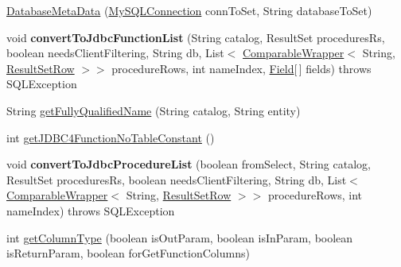 \begin{DoxyCompactItemize}
\item 
\mbox{\hyperlink{classcom_1_1mysql_1_1jdbc_1_1_database_meta_data_a754255faffa1310c4d9507733583ae72}{Database\+Meta\+Data}} (\mbox{\hyperlink{interfacecom_1_1mysql_1_1jdbc_1_1_my_s_q_l_connection}{My\+S\+Q\+L\+Connection}} conn\+To\+Set, String database\+To\+Set)
\item 
\mbox{\label{classcom_1_1mysql_1_1jdbc_1_1_database_meta_data_aaaa7875b33bba7a39bf30ce4d1d69211}} 
void {\bfseries convert\+To\+Jdbc\+Function\+List} (String catalog, Result\+Set procedures\+Rs, boolean needs\+Client\+Filtering, String db, List$<$ \mbox{\hyperlink{classcom_1_1mysql_1_1jdbc_1_1_database_meta_data_1_1_comparable_wrapper}{Comparable\+Wrapper}}$<$ String, \mbox{\hyperlink{classcom_1_1mysql_1_1jdbc_1_1_result_set_row}{Result\+Set\+Row}} $>$$>$ procedure\+Rows, int name\+Index, \mbox{\hyperlink{classcom_1_1mysql_1_1jdbc_1_1_field}{Field}}\mbox{[}$\,$\mbox{]} fields)  throws S\+Q\+L\+Exception 
\item 
String \mbox{\hyperlink{classcom_1_1mysql_1_1jdbc_1_1_database_meta_data_aa24b9831163c2cfb148ff010252a76a3}{get\+Fully\+Qualified\+Name}} (String catalog, String entity)
\item 
int \mbox{\hyperlink{classcom_1_1mysql_1_1jdbc_1_1_database_meta_data_a9f5f2d53d698291077d7cd3c283b29ec}{get\+J\+D\+B\+C4\+Function\+No\+Table\+Constant}} ()
\item 
\mbox{\label{classcom_1_1mysql_1_1jdbc_1_1_database_meta_data_a15e7ed984774c3a124dfe5b774369f01}} 
void {\bfseries convert\+To\+Jdbc\+Procedure\+List} (boolean from\+Select, String catalog, Result\+Set procedures\+Rs, boolean needs\+Client\+Filtering, String db, List$<$ \mbox{\hyperlink{classcom_1_1mysql_1_1jdbc_1_1_database_meta_data_1_1_comparable_wrapper}{Comparable\+Wrapper}}$<$ String, \mbox{\hyperlink{classcom_1_1mysql_1_1jdbc_1_1_result_set_row}{Result\+Set\+Row}} $>$$>$ procedure\+Rows, int name\+Index)  throws S\+Q\+L\+Exception 
\item 
int \mbox{\hyperlink{classcom_1_1mysql_1_1jdbc_1_1_database_meta_data_a8db5167e582f242a48275aaffc5aa04a}{get\+Column\+Type}} (boolean is\+Out\+Param, boolean is\+In\+Param, boolean is\+Return\+Param, boolean for\+Get\+Function\+Columns)
\item 
\mbox{\label{classcom_1_1mysql_1_1jdbc_1_1_database_meta_data_a5d8b6595c763c246752d350a20b4f763}} 

\end{DoxyCompactItemize}

